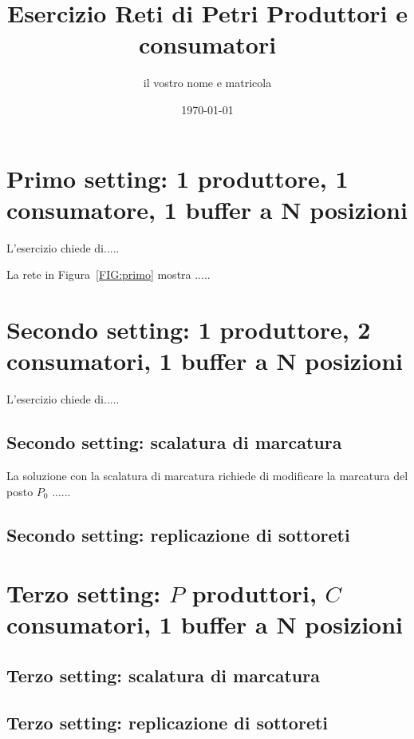 \documentclass{article}
\newcommand{\place}[1]{#1}
\begin{document}
\title{Esercizio Reti di Petri Produttori e consumatori}
\author{il vostro nome e matricola}



   

\date{\today}

\maketitle

\section{Primo setting: 1 produttore, 1 consumatore, 1 buffer a N posizioni}\label{SEC:primo}
L'esercizio chiede di.....

La rete in Figura~\ref{FIG:primo} mostra .....

\begin{figure*}[h!]
\centering
\caption{Una prima rete incompleta} \label{FIG:primo}
\end{figure*}


\section{Secondo  setting: 1 produttore, 2 consumatori,  1 buffer a N posizioni}\label{SEC:secondo}
L'esercizio chiede di.....
\subsection{Secondo  setting: scalatura di marcatura}\label{SEC:secondo-marking}
La soluzione con la scalatura di marcatura richiede di modificare la marcatura del posto \place{$P_0$} ......
\subsection{Secondo  setting: replicazione di sottoreti}\label{SEC:secondo-replica}


\section{Terzo  setting: $P$ produttori, $C$ consumatori,   1 buffer a N posizioni}\label{SEC:terzo}
\subsection{Terzo  setting: scalatura di marcatura}\label{SEC:terzo-marking}
\subsection{Terzo  setting: replicazione di sottoreti}\label{SEC:terzo-replica}
\end{document}
